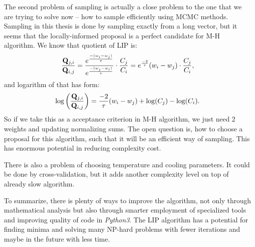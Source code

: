 	The second problem of sampling is actually a close problem to the one that we are trying to solve now -- how to sample efficiently using MCMC methods. Sampling in this thesis is done by sampling exactly from a long vector, but it seems that the locally-informed proposal is a perfect candidate for M-H algorithm. We know that quotient of LIP is:
	\begin{equation*}
		\frac{\mathbf{Q}_{j,i}}{\mathbf{Q}_{i,j}} = \frac{e^\frac{-(w_{i} - w_j)}{\tau}}{e^\frac{-(w_{j} - w_i)}{\tau}} \cdot \frac{C_j}{C_i} =  e^\frac{-2}{\tau}(w_{i} - w_j) \cdot \frac{C_j}{C_i},
	\end{equation*}
	and logarithm of that has form:
	\begin{equation*}
		\log\left(\frac{\mathbf{Q}_{j,i}}{\mathbf{Q}_{i,j}}\right)  = \frac{-2}{\tau}(w_{i} - w_j) + \log(C_j) - \log(C_i).
	\end{equation*}
	So if we take this as a acceptance criterion in M-H algorithm, we just need 2 weights and updating normalizing sums. The open question is, how to choose a proposal for this algorithm, such that it will be an efficient way of sampling. This has enormous potential in reducing complexity cost.
	
	There is also a problem of choosing temperature and cooling parameters. It could be done by cross-validation, but it adds another complexity level on top of already slow algorithm.
	
	To summarize, there is plenty of ways to improve the algorithm, not only through mathematical analysis but also through smarter employment of specialized tools and improving quality of code in \textit{Python3}. The LIP algorithm has a potential for finding minima and solving many NP-hard problems with fewer iterations and maybe in the future with less time.